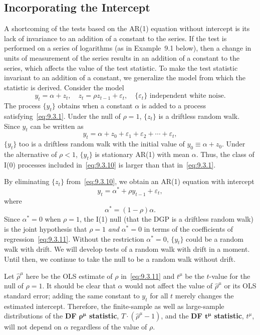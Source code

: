 \subsection*{Incorporating the Intercept}

A shortcoming of the tests based on the AR(1) equation without intercept is its lack
of invariance to an addition of a constant to the series. If the test is performed on a
series of logarithms (as in Example~9.1 below), then a change in units of measurement of the series results in an addition of a constant to the series, which affects
the value of the test statistic. To make the test statistic invariant to an addition of a
constant, we generalize the model from which the statistic is derived. Consider the
model
\begin{equation}
\label{eq:9.3.10}
y_t = \alpha + z_t, \quad z_t = \rho z_{t-1} + \varepsilon_t, \quad
\{\varepsilon_t\} \text{ independent white noise.}
\end{equation}
The process $\{y_t\}$ obtains when a constant $\alpha$ is added to a process satisfying~\eqref{eq:9.3.1}.
Under the null of $\rho = 1$, $\{z_t\}$ is a driftless random walk. Since $y_t$ can be written as
\[
y_t = \alpha + z_0 + \varepsilon_1 + \varepsilon_2 + \cdots + \varepsilon_t,
\]
$\{y_t\}$ too is a driftless random walk with the initial value of $y_0 \equiv \alpha + z_0$. Under the
alternative of $\rho < 1$, $\{y_t\}$ is stationary AR(1) with mean $\alpha$. Thus, the class of I(0)
processes included in~\eqref{eq:9.3.10} is larger than that in~\eqref{eq:9.3.1}.

By eliminating $\{z_t\}$ from~\eqref{eq:9.3.10}, we obtain an AR(1) equation with intercept
\begin{equation}
\label{eq:9.3.11}
y_t = \alpha^* + \rho y_{t-1} + \varepsilon_t,
\end{equation}
where
\begin{equation}
\label{eq:9.3.12}
\alpha^* = (1 - \rho)\alpha.
\end{equation}
Since $\alpha^* = 0$ when $\rho = 1$, the I(1) null (that the DGP is a driftless random walk) is
the joint hypothesis that $\rho = 1$ \emph{and} $\alpha^* = 0$ in terms of the coefficients of regression~\eqref{eq:9.3.11}. Without the restriction $\alpha^* = 0$, $\{y_t\}$ could be a random walk with drift.
We will develop tests of a random walk with drift in a moment. Until then, we
continue to take the null to be a random walk without drift.

Let $\hat{\rho}^\mu$ here be the OLS estimate of $\rho$ in~\eqref{eq:9.3.11} and $t^\mu$ be the $t$-value for the
null of $\rho = 1$. It should be clear that $\alpha$ would not affect the value of $\hat{\rho}^\mu$ or its OLS
standard error; adding the same constant to $y_t$ for all $t$ merely changes the estimated
intercept. Therefore, the finite-sample as well as large-sample distributions of the
\textbf{DF $\bm{\rho^\mu}$ statistic}, $T \cdot (\hat{\rho}^\mu - 1)$, and the \textbf{DF $\bm{t^\mu}$ statistic}, $t^\mu$, will not depend on $\alpha$
regardless of the value of $\rho$.

